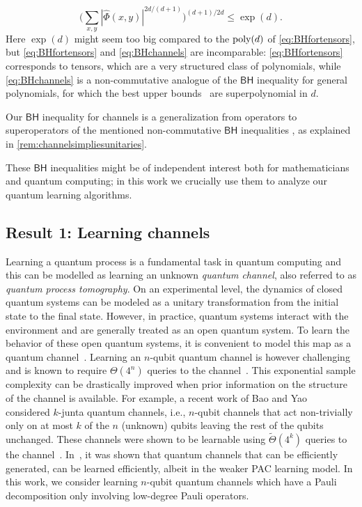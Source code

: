 \documentclass[11pt]{article}
\newcommand{\BH}{\textsf{BH}}
\theoremstyle{plain}
\newcommand{\poly}{\mbox{\rm poly}}
\theoremstyle{plain}
\theoremstyle{definition}
\theoremstyle{remark}
\theoremstyle{named}
\begin{document}
\begin{enumerate}
    \begin{equation}\label{eq:BHchannels}
    \Big(\sum_{x,y}|\widehat\Phi(x,y)|^{2d/(d+1)}\Big)^{(d+1)/2d}\leq \exp(d).
    \end{equation}
    Here $\exp(d)$ might seem too big compared to the $\poly(d)$ of \cref{eq:BHfortensors}, but \cref{eq:BHfortensors} and \cref{eq:BHchannels} are incomparable:  \cref{eq:BHfortensors} corresponds to tensors, which are a very structured class of polynomials, while \cref{eq:BHchannels} is a non-commutative analogue of the $\BH$ inequality for general polynomials, for which the best upper bounds~\cite{defant2019fourier} are superpolynomial in $d$.

    Our $\BH$ inequality for channels is a generalization from operators to superoperators of the mentioned non-commutative $\BH$ inequalities \cite{huang2022learning,volberg2023noncommutative}, as explained in \cref{rem:channelsimpliesunitaries}. 
    \end{enumerate}
These $\BH$ inequalities might be of independent interest both for mathematicians and quantum computing; in this work we crucially use them to analyze our quantum learning algorithms.

\subsection{Result 1: Learning channels}
Learning a quantum process is a fundamental task in quantum computing and this can be modelled as learning an unknown \emph{quantum channel}, also referred to as \emph{quantum process tomography}.  On an experimental level, the dynamics of closed quantum systems can be modeled as a unitary transformation from the initial state to the final state. However, in practice, quantum systems interact with the environment and are generally treated as an open quantum system. To learn the behavior of these open quantum systems, it is convenient to model this map as a quantum channel~\cite{nielsen_chuang}.
Learning an $n$-qubit quantum channel is however challenging and is known to require $\Theta(4^n)$ queries to the channel~\cite{gutoski2014process}. This exponential sample complexity can be drastically improved when prior information on the structure of the channel is available. For example, a recent work of Bao and Yao~\cite{bao2023nearly} considered $k$-junta quantum channels, i.e., $n$-qubit channels that act non-trivially only on at most $k$ of the $n$ (unknown) qubits leaving the rest of the qubits unchanged. These channels were shown to be learnable using $\widetilde\Theta(4^k)$ queries to the channel~\cite{bao2023nearly}. In~\cite{chung2018sample}, it was shown that quantum channels that can be efficiently generated, can be learned efficiently, albeit in the weaker PAC learning model. In this work, we consider learning  $n$-qubit quantum channels which have a Pauli decomposition only involving low-degree Pauli operators. 
\end{document}
